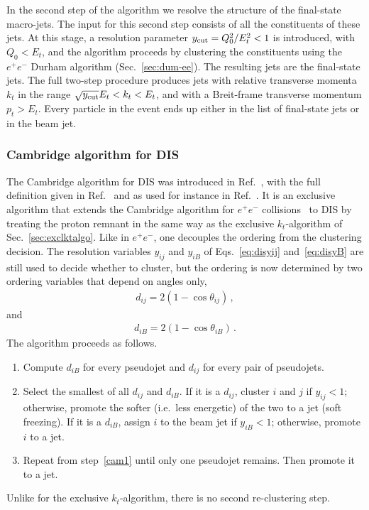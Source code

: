 In the second step of the algorithm we resolve the structure of the final-state macro-jets. 
%
The input for this second step consists of all the constituents of these jets. 
%
At this stage, a resolution parameter $y_{\rm cut} = Q_0^2/E_t^2 < 1$ is introduced, with $Q_0 < E_t$, and the algorithm proceeds by clustering the constituents using the $e^+e^-$ Durham algorithm (Sec.~\ref{sec:dum-ee}). 
% 
The resulting jets are the final-state jets. 
%
The full two-step procedure produces jets with relative transverse momenta $k_t$ in the range $\sqrt{y_{\rm cut}}E_t < k_t < E_t$, and with a Breit-frame transverse momentum $p_t > E_t$. 
%
Every particle in the event ends up either in the list of final-state jets or in the beam jet. 

\subsubsection{Cambridge algorithm for DIS}
\label{sec:camdis}
The Cambridge algorithm for DIS was introduced in
Ref.~\cite{Wobisch:1998wt}, with the full definition given in
Ref.~\cite{Wobisch:2000dk} and as used for instance in
Ref.~\cite{H1:2000bqr}. It is an exclusive algorithm that extends the
Cambridge algorithm for $e^+e^-$ collisions~\cite{Dokshitzer:1997in}
to DIS by treating the proton remnant in the same way as the exclusive
$k_t$-algorithm of Sec.~\ref{sec:exclktalgo}.
%
Like in $e^+e^-$, one decouples the ordering from the clustering
decision. The resolution variables $y_{ij}$ and $y_{iB}$ of
Eqs.~\eqref{eq:disyij} and~\eqref{eq:disyB} are still used to decide
whether to cluster, but the ordering is now determined by two
ordering variables that depend on angles only,
\begin{align}
d_{i j} = 2 (1 - \cos \theta_{i j})\,,
\end{align}
and 
\begin{align}
d_{i B} = 2 (1 - \cos \theta_{i B})\,.
\end{align}
The algorithm proceeds as follows.
\begin{enumerate}
  \item \label{cam1} Compute $d_{iB}$ for every pseudojet and
    $d_{ij}$ for every pair of pseudojets.
  \item Select the smallest of all $d_{ij}$ and $d_{iB}$. If it is a
    $d_{ij}$, cluster $i$ and $j$ if $y_{ij}<1$; otherwise, promote the
    softer (i.e.\ less energetic) of the two to a jet (soft freezing).
    If it is a $d_{iB}$, assign $i$ to the beam jet if $y_{iB}<1$;
    otherwise, promote $i$ to a jet.
  \item Repeat from step~\ref{cam1} until only one pseudojet
    remains. Then promote it to a jet.
\end{enumerate}
Unlike for the exclusive $k_t$-algorithm, there is no second
re-clustering step.  

